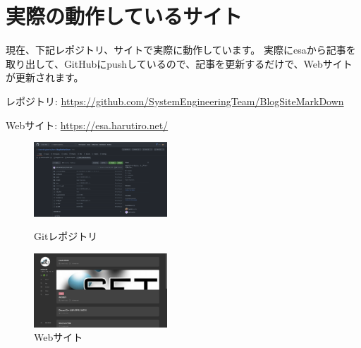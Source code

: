 \chapter{実際の動作しているサイト}

現在、下記レポジトリ、サイトで実際に動作しています。
実際にesaから記事を取り出して、GitHubにpushしているので、記事を更新するだけで、Webサイトが更新されます。


レポジトリ:
\url{https://github.com/SystemEngineeringTeam/BlogSiteMarkDown}

Webサイト:
\url{https://esa.harutiro.net/}

\begin{figure}[htbp]
  \begin{minipage}{0.5\hsize}
      \begin{center}
          \includegraphics[width=50mm]{./image/02-chap2/git-repo.png}
      \end{center}
      \caption{Gitレポジトリ}
      \label{chap2-git-repo}
  \end{minipage}
  \begin{minipage}{0.5\hsize}
      \begin{center}
          \includegraphics[width=50mm]{./image/02-chap2/sysken-web.png}
      \end{center}
      \caption{Webサイト}
      \label{chap2-web-site}
  \end{minipage}
\end{figure}
